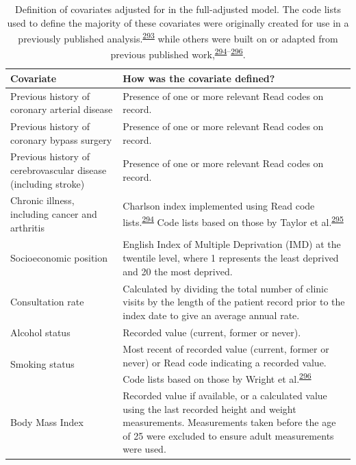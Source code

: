\documentclass[a4paper, twoside]{templates/ociamthesis}
\begin{document}
\begin{table}[H]

\caption[Covariates adjusted for.]{\label{tab:covariateDef-table}Definition of covariates adjusted for in the full-adjusted model. The code lists used to define the majority of these covariates were originally created for use in a previously published analysis.\textsuperscript{\protect\hyperlink{ref-walker2020}{293}} while others were built on or adapted from previous published work,\textsuperscript{\protect\hyperlink{ref-khan2010}{294}--\protect\hyperlink{ref-wright2017}{296}}.}
\centering
\fontsize{9}{11}\selectfont
\begin{tabular}[t]{>{\raggedright\arraybackslash}p{15em}>{\centering\arraybackslash}p{25em}}
\toprule
\textbf{Covariate } & \textbf{How was the covariate defined?}\\
\midrule
Previous history of coronary arterial disease & Presence of one or more relevant Read codes on record.\\
\midrule
Previous history of coronary bypass surgery & Presence of one or more relevant Read codes on record.\\
\midrule
Previous history of cerebrovascular disease (including stroke) & Presence of one or more relevant Read codes on record.\\
\midrule
Chronic illness, including cancer and arthritis & Charlson index implemented using Read code lists.\textsuperscript{\protect\hyperlink{ref-khan2010}{294}} Code lists based on those by Taylor et al.\textsuperscript{\protect\hyperlink{ref-taylor2016}{295}}\\
\midrule
Socioeconomic position & 2010 English Index of Multiple Deprivation (IMD) at the twentile level, where 1 represents the least deprived and 20 the most deprived.\\
\midrule
\addlinespace
Consultation rate & Calculated by dividing the total number of clinic visits by the length of the patient record prior to the index date to give an average annual rate.\\
\midrule
Alcohol status & Recorded value (current, former or never).\\
\midrule
Smoking status & Most recent of recorded value (current, former or never) or Read code indicating a recorded value. Code lists based on those by Wright et al.\textsuperscript{\protect\hyperlink{ref-wright2017}{296}}\\
\midrule
Body Mass Index & Recorded value if available, or a calculated value using the last recorded height and weight measurements. Measurements taken before the age of 25 were excluded to ensure adult measurements were used.\\

\end{tabular}
\end{table}
\end{document}
